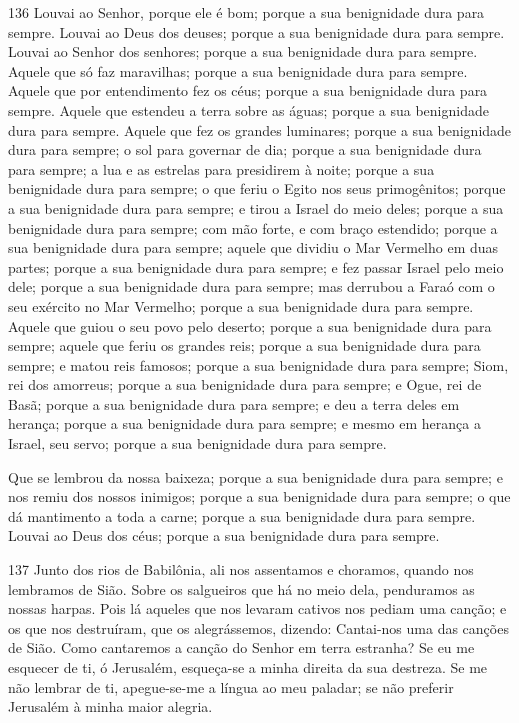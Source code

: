 \lettrine{136}{} Louvai ao Senhor, porque ele é bom; porque a
sua benignidade dura para sempre. Louvai ao Deus dos deuses;
porque a sua benignidade dura para sempre. Louvai ao Senhor dos
senhores; porque a sua benignidade dura para sempre. Aquele que
só faz maravilhas; porque a sua benignidade dura para sempre.
Aquele que por entendimento fez os céus; porque a sua
benignidade dura para sempre. Aquele que estendeu a terra sobre
as águas; porque a sua benignidade dura para sempre. Aquele que
fez os grandes luminares; porque a sua benignidade dura para sempre;
o sol para governar de dia; porque a sua benignidade dura para
sempre; a lua e as estrelas para presidirem à noite; porque a
sua benignidade dura para sempre; o que feriu o Egito nos
seus primogênitos; porque a sua benignidade dura para sempre;
e tirou a Israel do meio deles; porque a sua benignidade dura
para sempre; com mão forte, e com braço estendido; porque a
sua benignidade dura para sempre; aquele que dividiu o Mar
Vermelho em duas partes; porque a sua benignidade dura para sempre;
e fez passar Israel pelo meio dele; porque a sua benignidade
dura para sempre; mas derrubou a Faraó com o seu exército no
Mar Vermelho; porque a sua benignidade dura para sempre.
Aquele que guiou o seu povo pelo deserto; porque a sua
benignidade dura para sempre; aquele que feriu os grandes
reis; porque a sua benignidade dura para sempre; e matou reis
famosos; porque a sua benignidade dura para sempre; Siom, rei
dos amorreus; porque a sua benignidade dura para sempre; e
Ogue, rei de Basã; porque a sua benignidade dura para sempre;
e deu a terra deles em herança; porque a sua benignidade dura
para sempre; e mesmo em herança a Israel, seu servo; porque a
sua benignidade dura para sempre.

Que se lembrou da nossa baixeza; porque a sua benignidade dura
para sempre; e nos remiu dos nossos inimigos; porque a sua
benignidade dura para sempre; o que dá mantimento a toda a
carne; porque a sua benignidade dura para sempre. Louvai ao
Deus dos céus; porque a sua benignidade dura para sempre.

\bigskip

\lettrine{137}{} Junto dos rios de Babilônia, ali nos assentamos
e choramos, quando nos lembramos de Sião. Sobre os salgueiros
que há no meio dela, penduramos as nossas harpas. Pois lá
aqueles que nos levaram cativos nos pediam uma canção; e os que nos
destruíram, que os alegrássemos, dizendo: Cantai-nos uma das canções
de Sião. Como cantaremos a canção do Senhor em terra estranha?
Se eu me esquecer de ti, ó Jerusalém, esqueça-se a minha direita
da sua destreza. Se me não lembrar de ti, apegue-se-me a língua
ao meu paladar; se não preferir Jerusalém à minha maior alegria.

